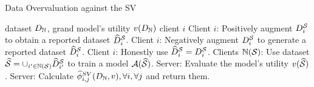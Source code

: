 \begin{algorithm}[t]
    \caption{Data Overvaluation against the SV}
    \label{alg:data_overvaluation}
\begin{algorithmic}[1]
    dataset $D_{\mathbb{N}}$, grand model's utility $v(D_{\mathbb{N}})$
     client $i$
                \STATE Client $i$: Positively augment $D^{\mathcal{S}}_{i}$ to obtain a reported dataset $\widehat{D}^{\mathcal{S}}_{i}$.
                \STATE Client $i$: Negatively augment $D^{\mathcal{S}}_{i}$ to generate a reported dataset $\widehat{D}^{\mathcal{S}}_{i}$.
            \ELSE
                \STATE Client $i$: Honestly use $\widehat{D}^{\mathcal{S}}_{i} = D^{\mathcal{S}}_{i}$.
            \ENDIF
        \ENDIF
        \STATE Clients $\mathbb{N}(\mathcal{S})$: Use dataset $\widehat{\mathcal{S}}=\cup_{i'\in \mathbb{N}(\mathcal{S})}  \widehat{D}^{\mathcal{S}}_{i'}$ to train a model $\mathcal{A}(\widehat{\mathcal{S}})$.
        \STATE Server: Evaluate the model's utility $v(\widehat{\mathcal{S}})$.
   \ENDFOR
   \STATE Server: Calculate $\widehat{\phi}^{SV}_{i,j}(D_{\mathbb{N}}, v), \forall i, \forall j$ and return them.
\end{algorithmic}
\end{algorithm}

